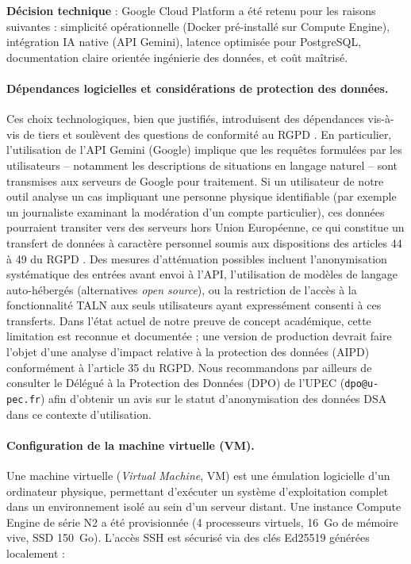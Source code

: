 \documentclass[10pt,twocolumn,a4paper]{article}
\begin{document}
\textbf{Décision technique} : Google Cloud Platform a été retenu pour les raisons suivantes : simplicité opérationnelle (Docker \cite{docker} pré-installé sur Compute Engine), intégration IA native (API Gemini), latence optimisée pour PostgreSQL, documentation claire orientée ingénierie des données, et coût maîtrisé.

\paragraph{Dépendances logicielles et considérations de protection des données.} Ces choix technologiques, bien que justifiés, introduisent des dépendances vis-à-vis de tiers et soulèvent des questions de conformité au RGPD \cite{rgpd}. En particulier, l'utilisation de l'API Gemini (Google) implique que les requêtes formulées par les utilisateurs -- notamment les descriptions de situations en langage naturel -- sont transmises aux serveurs de Google pour traitement. Si un utilisateur de notre outil analyse un cas impliquant une personne physique identifiable (par exemple un journaliste examinant la modération d'un compte particulier), ces données pourraient transiter vers des serveurs hors Union Européenne, ce qui constitue un transfert de données à caractère personnel soumis aux dispositions des articles 44 à 49 du RGPD \cite{rgpd}. Des mesures d'atténuation possibles incluent l'anonymisation systématique des entrées avant envoi à l'API, l'utilisation de modèles de langage auto-hébergés (alternatives \textit{open source}), ou la restriction de l'accès à la fonctionnalité TALN aux seuls utilisateurs ayant expressément consenti à ces transferts. Dans l'état actuel de notre preuve de concept académique, cette limitation est reconnue et documentée ; une version de production devrait faire l'objet d'une analyse d'impact relative à la protection des données (AIPD) conformément à l'article 35 du RGPD. Nous recommandons par ailleurs de consulter le Délégué à la Protection des Données (DPO) de l'UPEC (\texttt{dpo@u-pec.fr}) afin d'obtenir un avis sur le statut d'anonymisation des données DSA dans ce contexte d'utilisation.

\paragraph{Configuration de la machine virtuelle (VM).} Une machine virtuelle (\textit{Virtual Machine}, VM) est une émulation logicielle d'un ordinateur physique, permettant d'exécuter un système d'exploitation complet dans un environnement isolé au sein d'un serveur distant. Une instance Compute Engine de série N2 a été provisionnée (4 processeurs virtuels, 16~Go de mémoire vive, SSD 150~Go). L'accès SSH est sécurisé via des clés Ed25519 générées localement :
\end{document}
